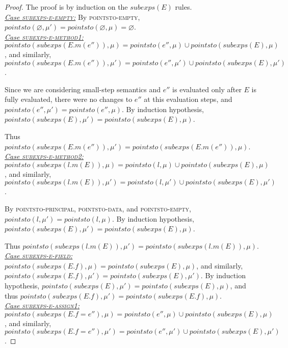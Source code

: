 \documentclass{llncs}
\begin{document}
\begin{proof} The proof is by induction on the $subexps(E)$ rules.\\

\noindent\underline{\textit{Case \textsc{subexps-e-empty}:}} By \textsc{pointsto-empty}, $pointsto(\varnothing, \mu') = pointsto(\varnothing, \mu) = \varnothing$.\\

\noindent\underline{\textit{Case \textsc{subexps-e-method1}:}} $pointsto(subexps(E.m(e'')), \mu) = pointsto(e'', \mu) \cup pointsto(subexps(E), \mu)$, and similarly, $pointsto(subexps(E.m(e'')), \mu') = pointsto(e'', \mu') \cup pointsto(subexps(E), \mu')$.

Since we are considering small-step semantics and $e''$ is evaluated only after $E$ is fully evaluated, there were no changes to $e''$ at this evaluation steps, and $pointsto(e'', \mu') = pointsto(e'', \mu)$. By induction hypothesis, $pointsto(subexps(E), \mu') = pointsto(subexps(E), \mu)$.

Thus $pointsto(subexps(E.m(e'')), \mu') =pointsto(subexps(E.m(e'')), \mu)$.\\

\noindent\underline{\textit{Case \textsc{subexps-e-method2}:}} $pointsto(subexps(l.m(E)), \mu) = pointsto(l, \mu) \cup pointsto(subexps(E), \mu)$, and similarly, $pointsto(subexps(l.m(E)), \mu') = pointsto(l, \mu') \cup pointsto(subexps(E), \mu')$.

By \textsc{pointsto-principal}, \textsc{pointsto-data}, and \textsc{pointsto-empty}, $pointsto(l, \mu') = pointsto(l, \mu)$. By induction hypothesis, $pointsto(subexps(E), \mu') = pointsto(subexps(E), \mu)$.

Thus $pointsto(subexps(l.m(E)), \mu') =pointsto(subexps(l.m(E)), \mu)$.\\

\noindent\underline{\textit{Case \textsc{subexps-e-field}:}} $pointsto(subexps(E.f), \mu) = pointsto(subexps(E), \mu)$, and similarly,\\
$pointsto(subexps(E.f), \mu') = pointsto(subexps(E), \mu')$. By induction hypothesis, $pointsto(subexps(E), \mu') = pointsto(subexps(E), \mu)$, and thus $pointsto(subexps(E.f), \mu') =pointsto(subexps(E.f), \mu)$.\\

\noindent\underline{\textit{Case \textsc{subexps-e-assign1}:}} $pointsto(subexps(E.f = e''), \mu) = pointsto(e'', \mu) \cup pointsto(subexps(E), \mu)$, and similarly, $pointsto(subexps(E.f = e''), \mu') = pointsto(e'', \mu') \cup pointsto(subexps(E), \mu')$.


\end{proof}
\end{document}
